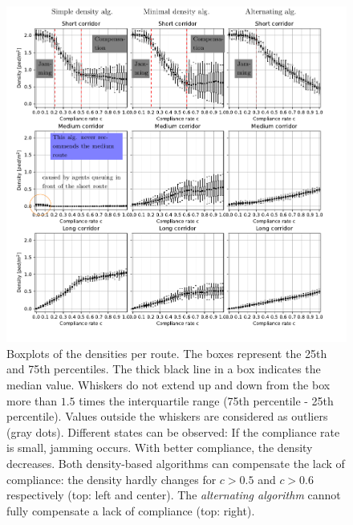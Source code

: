 \begin{figure}[H]
\includegraphics[width=1.1\textwidth]{../figures/investigation/VergleichUmleitalgorithmen/densities_tikz.pdf} 
\caption[Boxplots of the densities per route ]{Boxplots of the densities per route.
The boxes represent the 25th and 75th percentiles. The thick black line in a box indicates the median value. Whiskers do not extend up and down from the box more than $1.5$ times the interquartile range (75th percentile - 25th percentile). Values outside the whiskers are considered as outliers (gray dots). Different states can be observed: If the compliance rate is small, jamming occurs. With better compliance, the density decreases. Both density-based algorithms can compensate the lack of compliance: the density hardly changes for $c>0.5$ and $c>0.6$ respectively (top: left and center). The \textit{alternating algorithm} cannot fully compensate a lack of compliance (top: right).}
\label{fig:densitiesFig6}
\end{figure}



